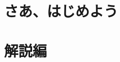 \documentclass[
uplatex,
b5paper,
10pt,
dvipdfmx
]{jsbook}
\newif\ifEnglish
\begin{document}
\setcounter{tocdepth}{0}
\tableofcontents
\mainmatter

\ifEnglish
\chapter{Getting Started}
\else
\chapter{さあ、はじめよう}
\fi


\label{113010_11Dec18} %

\ifEnglish
\chapter{Commentary}
\else
\chapter{解説編}
\fi
\end{document}
